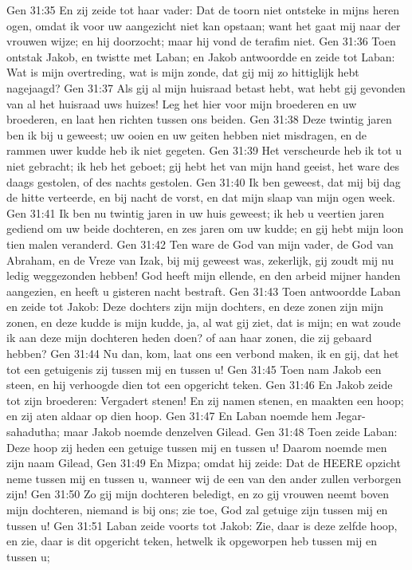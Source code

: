 Gen 31:35  En zij zeide tot haar vader: Dat de toorn niet ontsteke in mijns heren ogen, omdat ik voor uw aangezicht niet kan opstaan; want het gaat mij naar der vrouwen wijze; en hij doorzocht; maar hij vond de terafim niet.
Gen 31:36  Toen ontstak Jakob, en twistte met Laban; en Jakob antwoordde en zeide tot Laban: Wat is mijn overtreding, wat is mijn zonde, dat gij mij zo hittiglijk hebt nagejaagd?
Gen 31:37  Als gij al mijn huisraad betast hebt, wat hebt gij gevonden van al het huisraad uws huizes! Leg het hier voor mijn broederen en uw broederen, en laat hen richten tussen ons beiden.
Gen 31:38  Deze twintig jaren ben ik bij u geweest; uw ooien en uw geiten hebben niet misdragen, en de rammen uwer kudde heb ik niet gegeten.
Gen 31:39  Het verscheurde heb ik tot u niet gebracht; ik heb het geboet; gij hebt het van mijn hand geeist, het ware des daags gestolen, of des nachts gestolen.
Gen 31:40  Ik ben geweest, dat mij bij dag de hitte verteerde, en bij nacht de vorst, en dat mijn slaap van mijn ogen week.
Gen 31:41  Ik ben nu twintig jaren in uw huis geweest; ik heb u veertien jaren gediend om uw beide dochteren, en zes jaren om uw kudde; en gij hebt mijn loon tien malen veranderd.
Gen 31:42  Ten ware de God van mijn vader, de God van Abraham, en de Vreze van Izak, bij mij geweest was, zekerlijk, gij zoudt mij nu ledig weggezonden hebben! God heeft mijn ellende, en den arbeid mijner handen aangezien, en heeft u gisteren nacht bestraft.
Gen 31:43  Toen antwoordde Laban en zeide tot Jakob: Deze dochters zijn mijn dochters, en deze zonen zijn mijn zonen, en deze kudde is mijn kudde, ja, al wat gij ziet, dat is mijn; en wat zoude ik aan deze mijn dochteren heden doen? of aan haar zonen, die zij gebaard hebben?
Gen 31:44  Nu dan, kom, laat ons een verbond maken, ik en gij, dat het tot een getuigenis zij tussen mij en tussen u!
Gen 31:45  Toen nam Jakob een steen, en hij verhoogde dien tot een opgericht teken.
Gen 31:46  En Jakob zeide tot zijn broederen: Vergadert stenen! En zij namen stenen, en maakten een hoop; en zij aten aldaar op dien hoop.
Gen 31:47  En Laban noemde hem Jegar-sahadutha; maar Jakob noemde denzelven Gilead.
Gen 31:48  Toen zeide Laban: Deze hoop zij heden een getuige tussen mij en tussen u! Daarom noemde men zijn naam Gilead,
Gen 31:49  En Mizpa; omdat hij zeide: Dat de HEERE opzicht neme tussen mij en tussen u, wanneer wij de een van den ander zullen verborgen zijn!
Gen 31:50  Zo gij mijn dochteren beledigt, en zo gij vrouwen neemt boven mijn dochteren, niemand is bij ons; zie toe, God zal getuige zijn tussen mij en tussen u!
Gen 31:51  Laban zeide voorts tot Jakob: Zie, daar is deze zelfde hoop, en zie, daar is dit opgericht teken, hetwelk ik opgeworpen heb tussen mij en tussen u;
